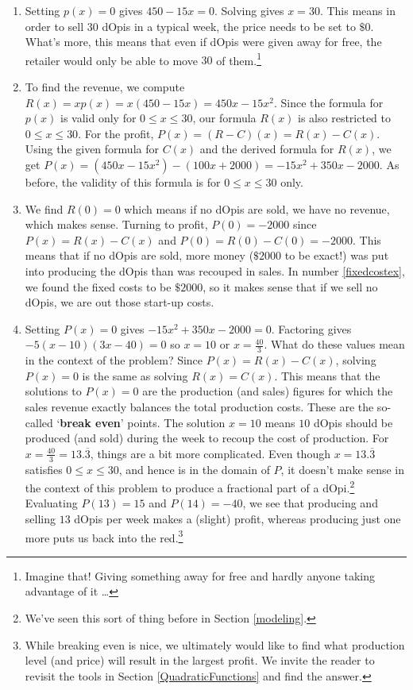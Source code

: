 \documentclass{ximera}
\begin{document}
\begin{example}
\begin{explanation}
\begin{enumerate}
\item  Setting $p(x) = 0$ gives $450-15x = 0$.  Solving gives $x = 30$.  This means in order to sell $30$ dOpis in a typical week, the price needs to be set to $\$ 0$. What's more, this means that even if dOpis were given away for free, the retailer would only be able to move $30$ of them.\footnote{Imagine that!  Giving something away for free and hardly anyone taking advantage of it \ldots}

\item  To find the revenue, we compute $R(x) = x p(x) = x (450 - 15x) = 450x - 15x^2$.  Since the formula for $p(x)$ is valid only for $0 \leq x \leq 30$, our formula $R(x)$ is also restricted to $0 \leq x \leq 30$.  For the profit, $P(x) = (R-C)(x) = R(x) - C(x)$.  Using the given formula for $C(x)$ and the derived formula for $R(x)$, we get $P(x) = \left(450x - 15x^2\right) -(100x+2000) = -15x^2+350x-2000$. As before, the validity of this formula is for $0 \leq x \leq 30$ only.

\item  We find $R(0) = 0$ which means if no dOpis are sold, we have no revenue, which makes sense.  Turning to profit, $P(0) = -2000$ since $P(x) = R(x) - C(x)$ and $P(0) = R(0) - C(0) = -2000$.  This means that if no dOpis are sold, more money ($\$2000$ to be exact!) was put into producing the dOpis than was recouped in sales. In number \ref{fixedcostex}, we found the fixed costs to be $\$2000$, so it makes sense that if we sell no dOpis, we are out those start-up costs. 

\item Setting $P(x) = 0$ gives $-15x^2+350x-2000 = 0$.  Factoring gives $-5(x-10)(3x-40) = 0$ so $x = 10$ or $x = \frac{40}{3}$.  What do these values mean in the context of the problem?  Since $P(x) = R(x) - C(x)$, solving $P(x) = 0$ is the same as solving $R(x) = C(x)$. This means that the solutions to $P(x) = 0$ are the production (and sales) figures for which the sales revenue exactly balances the total production costs.  These are the so-called `\textbf{break even}' points.  The solution $x=10$ means $10$ dOpis should be produced (and sold) during the week to recoup the cost of production. For $x = \frac{40}{3} = 13.\overline{3}$, things are a bit more complicated.  Even though $x = 13.\overline{3}$ satisfies $0 \leq x \leq 30$, and hence is in the domain of $P$, it doesn't make sense in the context of this problem to produce a fractional part of a dOpi.\footnote{We've seen this sort of thing before in Section \ref{modeling}.}  Evaluating $P(13) = 15$ and $P(14) = -40$, we see that producing and selling $13$ dOpis per week makes a (slight) profit, whereas producing just one more puts us back into the red.\footnote{While breaking even is nice, we ultimately would like to find what production level (and price) will result in the largest profit.  We invite the reader to revisit the tools in Section \ref{QuadraticFunctions} and find the answer.} 


\end{enumerate}
\end{explanation}
\end{example}
\end{document}

